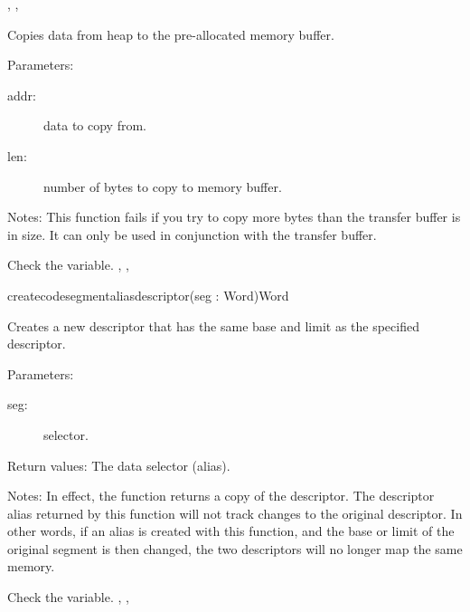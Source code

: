 {, , 
}

{Copies data from heap to the pre-allocated \dos memory buffer.

Parameters:
\begin{description}
\item[addr:\ ] data to copy from.
\item[len:\ ] number of bytes to copy to \dos memory buffer.
\end{description}

Notes: This function fails if you try to copy more bytes than the transfer
buffer is in size. It can only be used in conjunction with the transfer
buffer.
}
{ Check the  variable.}
{, , 
}

{createcodesegmentaliasdescriptor}{(seg : Word)}{Word}
{
Creates a new descriptor that has the same base and limit as the specified
descriptor.

Parameters: 
\begin{description}
\item[seg:\ ] selector.
\end{description}

Return values: The data selector (alias).

Notes: In effect, the function returns a copy of the descriptor. The
descriptor alias returned by this function will not track changes to the
original descriptor. In other words, if an alias is created with this
function, and the base or limit of the original segment is then changed, the
two descriptors will no longer map the same memory.
}
{Check the  variable.}
{ 
,
, 
 }


